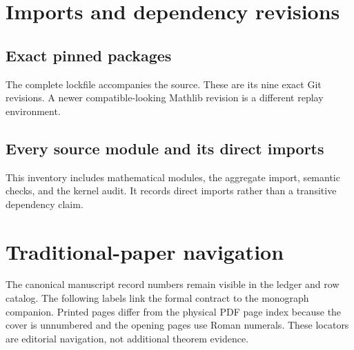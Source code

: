 \section{Imports and dependency revisions}
\subsection{Exact pinned packages}
The complete lockfile accompanies the source. These are its nine exact Git revisions. A newer compatible-looking Mathlib revision is a different replay environment.

\subsection{Every source module and its direct imports}
This inventory includes mathematical modules, the aggregate import, semantic checks, and the kernel audit. It records direct imports rather than a transitive dependency claim.

\clearpage
\section{Traditional-paper navigation}
The canonical manuscript record numbers remain visible in the ledger and row catalog. The following labels link the formal contract to the monograph companion. Printed pages differ from the physical PDF page index because the cover is unnumbered and the opening pages use Roman numerals. These locators are editorial navigation, not additional theorem evidence.


